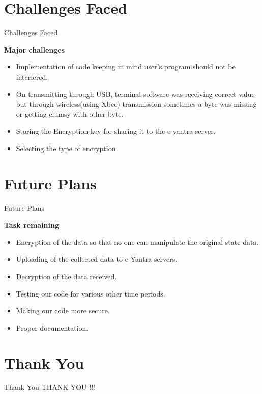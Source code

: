 \documentclass[10pt, a4paper]{beamer}
\begin{document}
\section{Challenges Faced}
\begin{frame}{Challenges Faced}
\begin{flushleft}
{\Large\bf Major challenges}\\
	\begin{itemize}
       \item Implementation of code keeping in mind user's program should not be interfered.
		        \item On transmitting through USB, terminal software was receiving correct value but
         through wireless(using Xbee) transmission sometimes a byte was missing or getting clumsy
          with other byte.
          \item Storing the Encryption key for sharing it to the e-yantra server.
       \item Selecting the type of encryption.

	\end{itemize}
\end{flushleft}
\end{frame}

\section{Future Plans}
\begin{frame}{Future Plans}
\begin{flushleft}
{\Large\bf Task remaining}\\
	\begin{itemize}
        \item Encryption of the data so that no one can manipulate the original state data.
        \item Uploading of the collected data to e-Yantra servers.
        \item Decryption of the data received.
        \item Testing our code for various other time periods.
        \item Making our code more secure.
        \item Proper documentation.
	\end{itemize}
\end{flushleft}
\end{frame}


\section{Thank You}
\begin{frame}{Thank You}
	\centering THANK YOU !!!
\end{frame}
\end{document}

